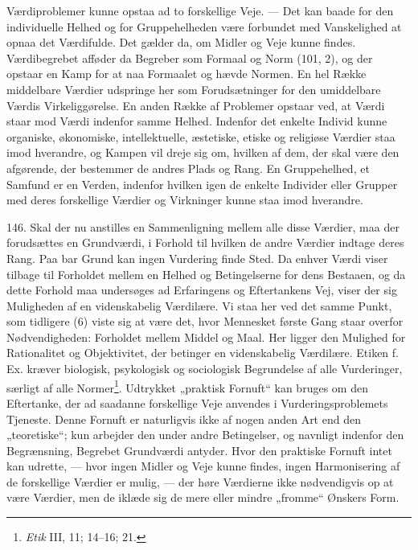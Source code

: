 \documentclass[12pt,a4paper]{book}
\newcommand{\apage}[1]{\marginnote{\footnotesize\textit{[#1]}}}
\begin{document}
Værdiproblemer kunne opstaa ad to forskellige Veje. --- Det kan baade for den individuelle
Helhed og for Gruppehelheden være forbundet med Vanskelighed at opnaa det Værdifulde. Det
gælder da, om Midler og Veje kunne findes. Værdibegrebet afføder da Begreber som Formaal og
Norm (101, 2), og der opstaar en Kamp for at naa Formaalet og hævde Normen. En hel Række
middelbare Værdier udspringe her som Forudsætninger for den umiddelbare Værdis \apage{348}
Virkeliggørelse. En anden Række af Problemer opstaar ved, at Værdi staar mod Værdi indenfor
samme Helhed. Indenfor det enkelte Individ kunne organiske, økonomiske, intellektuelle,
æstetiske, etiske og religiøse Værdier staa imod hverandre, og Kampen vil dreje sig om,
hvilken af dem, der skal være den afgørende, der bestemmer de andres Plads og Rang. En
Gruppehelhed, et Samfund er en Verden, indenfor hvilken igen de enkelte Individer eller
Grupper med deres forskellige Værdier og Virkninger kunne staa imod hverandre.

146. Skal der nu anstilles en Sammenligning mellem alle disse Værdier, maa der forudsættes
en Grundværdi, i Forhold til hvilken de andre Værdier indtage deres Rang. Paa bar Grund kan
ingen Vurdering finde Sted. Da enhver Værdi viser tilbage til Forholdet mellem en Helhed og
Betingelserne for dens Bestaaen, og da dette Forhold maa undersøges ad Erfaringens og
Eftertankens Vej, viser der sig Muligheden af en videnskabelig Værdilære. Vi staa her ved
det samme Punkt, som tidligere (6) viste sig at være det, hvor Mennesket første Gang staar
overfor Nødvendigheden: Forholdet mellem Middel og Maal. Her ligger den Mulighed for
Rationalitet og Objektivitet, der betinger en videnskabelig Værdilære. Etiken f. Ex.
kræver biologisk, psykologisk og sociologisk Begrundelse af alle Vurderinger, særligt af
alle Normer\footnote{\emph{Etik} III, 11; 14--16; 21.}. Udtrykket „praktisk Fornuft“ kan
bruges om den Eftertanke, der ad saadanne forskellige Veje anvendes i Vurderingsproblemets
Tjeneste. Denne Fornuft er naturligvis ikke af nogen anden Art end den „teoretiske“; kun
arbejder den under andre Betingelser, og navnligt indenfor den Begrænsning, Begrebet
Grundværdi antyder. Hvor den praktiske Fornuft intet kan udrette, --- hvor ingen Midler og
Veje kunne findes, ingen Harmonisering af de forskellige Værdier er mulig, --- der høre
Værdierne ikke nødvendigvis op at være Værdier, men de iklæde sig de mere eller mindre
„fromme“ Ønskers Form.
\end{document}
